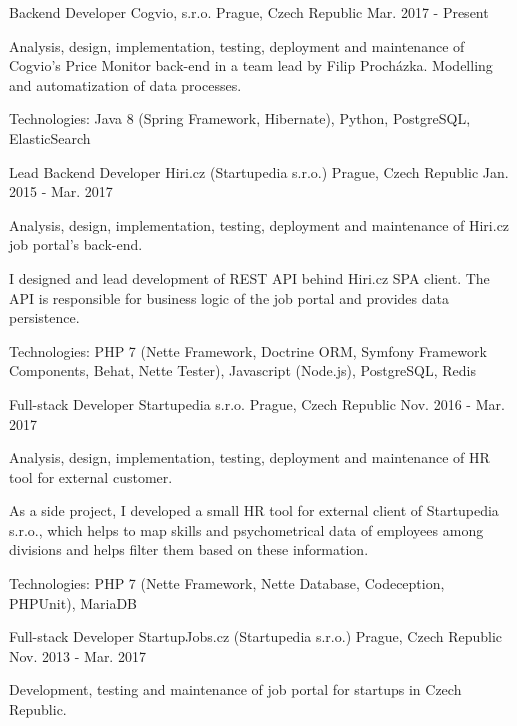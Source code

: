 \begin{cventries}
  \cventry
    {Backend Developer}
    {Cogvio, s.r.o.}
    {Prague, Czech Republic}
    {Mar. 2017 - Present}
    {
    \begin{cvitems}
      \item {Analysis, design, implementation, testing, deployment and maintenance of Cogvio's Price Monitor back-end in a team lead by Filip Procházka. Modelling and automatization of data processes.}
      \item {Technologies: Java 8 (Spring Framework, Hibernate), Python, PostgreSQL, ElasticSearch}
    \end{cvitems}
  }
  \cventry
    {Lead Backend Developer}
    {Hiri.cz (Startupedia s.r.o.)}
    {Prague, Czech Republic}
    {Jan. 2015 - Mar. 2017}
    {
      \begin{cvitems}
        \item {Analysis, design, implementation, testing, deployment and maintenance of Hiri.cz job portal's back-end.}
        \item {I designed and lead development of REST API behind Hiri.cz SPA client. The API is responsible for business logic of the job portal and provides data persistence.}
        \item {Technologies: PHP 7 (Nette Framework, Doctrine ORM, Symfony Framework Components, Behat, Nette Tester), Javascript (Node.js), PostgreSQL, Redis}
      \end{cvitems}
    }
  \cventry
    {Full-stack Developer}
    {Startupedia s.r.o.}
    {Prague, Czech Republic}
    {Nov. 2016 - Mar. 2017}
    {
      \begin{cvitems}
        \item {Analysis, design, implementation, testing, deployment and maintenance of HR tool for external customer.}
        \item {As a side project, I developed a small HR tool for external client of Startupedia s.r.o., which helps to map skills and psychometrical data of employees among divisions and helps filter them based on these information.}
        \item {Technologies: PHP 7 (Nette Framework, Nette Database, Codeception, PHPUnit), MariaDB}
      \end{cvitems}
    }
  \cventry
    {Full-stack Developer}
    {StartupJobs.cz (Startupedia s.r.o.)}
    {Prague, Czech Republic}
    {Nov. 2013 - Mar. 2017}
    {
      \begin{cvitems}
        \item {Development, testing and maintenance of job portal for startups in Czech Republic.}

\end{cvitems}}
\end{cventries}
